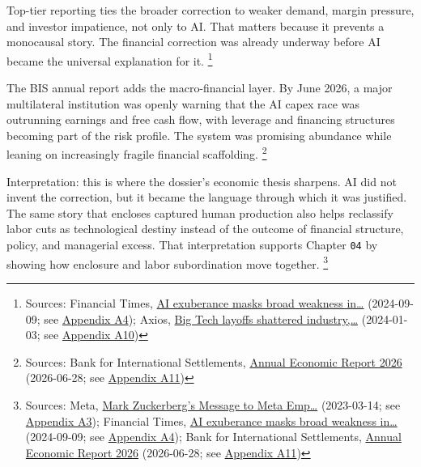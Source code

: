 \documentclass[
  american,
  11pt,
  letterpaper,
]{article}
\begin{document}
Top-tier reporting ties the broader correction to weaker demand, margin
pressure, and investor impatience, not only to AI. That matters because
it prevents a monocausal story. The financial correction was already
underway before AI became the universal explanation for it. \footnote{Sources:
  Financial Times,
  \href{https://www.ft.com/content/0b14d871-2d19-46f1-9660-5466301e8066}{AI
  exuberance masks broad weakness in\ldots{}} (2024-09-09; see
  \hyperref[appendix-a4-ai-exuberance-masks-broad-weakness-in-tech-sector-say-investors]{Appendix
  A4}); Axios,
  \href{https://www.axios.com/2024/01/03/tech-layoffs-google-microsoft-employees-impact-anxiety}{Big
  Tech layoffs shattered industry,\ldots{}} (2024-01-03; see
  \hyperref[appendix-a10-big-tech-layoffs-shattered-industry-worker-confidence]{Appendix
  A10})}

The BIS annual report adds the macro-financial layer. By June 2026, a
major multilateral institution was openly warning that the AI capex race
was outrunning earnings and free cash flow, with leverage and financing
structures becoming part of the risk profile. The system was promising
abundance while leaning on increasingly fragile financial scaffolding.
\footnote{Sources: Bank for International Settlements,
  \href{https://www.bis.org/publ/arpdf/ar2026e.pdf}{Annual Economic
  Report 2026} (2026-06-28; see
  \hyperref[appendix-a11-annual-economic-report-2026]{Appendix A11})}

Interpretation: this is where the dossier's economic thesis sharpens. AI
did not invent the correction, but it became the language through which
it was justified. The same story that encloses captured human production
also helps reclassify labor cuts as technological destiny instead of the
outcome of financial structure, policy, and managerial excess. That
interpretation supports Chapter \texttt{04} by showing how enclosure and
labor subordination move together. \footnote{Sources: Meta,
  \href{https://about.fb.com/news/2023/03/mark-zuckerberg-meta-year-of-efficiency/}{Mark
  Zuckerberg's Message to Meta Emp\ldots{}} (2023-03-14; see
  \hyperref[appendix-a3-mark-zuckerberg-s-message-to-meta-employees]{Appendix
  A3}); Financial Times,
  \href{https://www.ft.com/content/0b14d871-2d19-46f1-9660-5466301e8066}{AI
  exuberance masks broad weakness in\ldots{}} (2024-09-09; see
  \hyperref[appendix-a4-ai-exuberance-masks-broad-weakness-in-tech-sector-say-investors]{Appendix
  A4}); Bank for International Settlements,
  \href{https://www.bis.org/publ/arpdf/ar2026e.pdf}{Annual Economic
  Report 2026} (2026-06-28; see
  \hyperref[appendix-a11-annual-economic-report-2026]{Appendix A11})}
\end{document}
